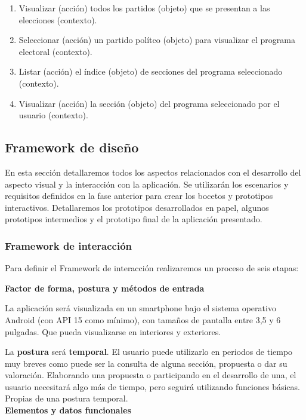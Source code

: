 \begin{enumerate}
\item Visualizar (acción) todos los partidos (objeto) que se presentan a las elecciones (contexto).
\item Seleccionar (acción) un partido polítco (objeto) para visualizar el programa electoral (contexto).
\item Listar (acción) el índice (objeto) de secciones del programa seleccionado (contexto).
\item Visualizar (acción) la sección (objeto) del programa seleccionado por el usuario (contexto).
\end{enumerate}

\subsection{Framework de diseño} \label{ssec:prototypes}

En esta sección detallaremos todos los aspectos relacionados con el desarrollo del aspecto visual y la interacción con la aplicación. Se utilizarán los escenarios y requisitos definidos en la fase anterior para crear los bocetos y prototipos interactivos. Detallaremos los prototipos desarrollados en papel, algunos prototipos intermedios y el prototipo final de la aplicación presentado.

\subsubsection{Framework de interacción}

Para definir el Framework de interacción realizaremos un proceso de seis etapas:

\textbf{Factor de forma, postura y métodos de entrada}

La aplicación será visualizada en un smartphone bajo el sistema operativo Android (con API 15 como mínimo), con tamaños de pantalla entre 3,5 y 6 pulgadas. Que pueda visualizarse en interiores y exteriores.

La \textbf{postura} será \textbf{temporal}. El usuario puede utilizarlo en periodos de tiempo muy breves como puede ser la consulta de alguna sección, propuesta o dar su valoración. Elaborando una propuesta o participando en el desarrollo de una, el usuario necesitará algo más de tiempo, pero seguirá utilizando funciones básicas. Propias de una postura temporal. \\[2cm.]

\textbf{Elementos y datos funcionales} 

